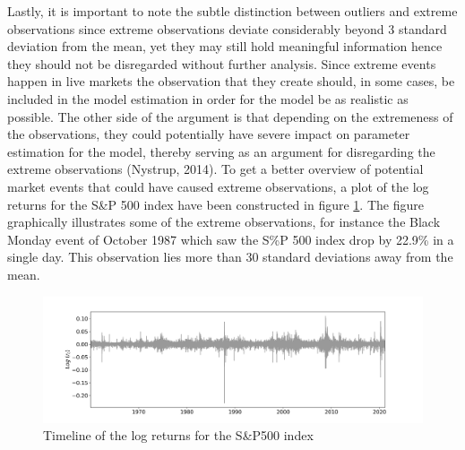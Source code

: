 Lastly, it is important to note the subtle distinction between outliers and extreme observations since extreme observations deviate considerably beyond 3 standard deviation from the mean, yet they may still hold meaningful information hence they should not be disregarded without further analysis.
Since extreme events happen in live markets the observation that they create should, in some cases, be included in the model estimation in order for the model be as realistic as possible. The other side of the argument is that depending on the extremeness of the observations, they could potentially have severe impact on parameter estimation for the model, thereby serving as an argument for disregarding the extreme observations (Nystrup, 2014). To get a better overview of potential market events that could have caused extreme observations, a plot of the log returns for the S\&P 500 index have been constructed in figure \ref{fig: log_returns_all_indices}. The figure graphically illustrates some of the extreme observations, for instance the Black Monday event of October 1987 which saw the S\%P 500 index drop by 22.9\% in a single day. This observation lies more than 30 standard deviations away from the mean.

\begin{figure}[H] 
    \centering
    \includegraphics[width=1\textwidth]{analysis/data_description/images/SP500_log_returns.png}
    \caption{Timeline of the log returns for the S\&P500 index}
    \label{fig: log_returns_all_indices}
\end{figure}

\label{subsection: distributional properties}

